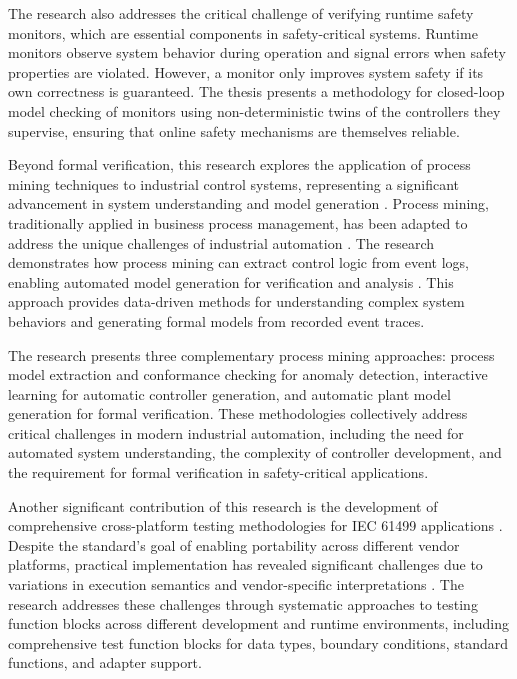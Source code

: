 The research also addresses the critical challenge of verifying runtime safety monitors, which are essential components in safety-critical systems. Runtime monitors observe system behavior during operation and signal errors when safety properties are violated. However, a monitor only improves system safety if its own correctness is guaranteed. The thesis presents a methodology for closed-loop model checking of monitors using non-deterministic twins of the controllers they supervise, ensuring that online safety mechanisms are themselves reliable.

Beyond formal verification, this research explores the application of process mining techniques to industrial control systems, representing a significant advancement in system understanding and model generation \cite{van2016process}. Process mining, traditionally applied in business process management, has been adapted to address the unique challenges of industrial automation \cite{van2012process1}. The research demonstrates how process mining can extract control logic from event logs, enabling automated model generation for verification and analysis \cite{van2004workflow}. This approach provides data-driven methods for understanding complex system behaviors and generating formal models from recorded event traces.

The research presents three complementary process mining approaches: process model extraction and conformance checking for anomaly detection, interactive learning for automatic controller generation, and automatic plant model generation for formal verification. These methodologies collectively address critical challenges in modern industrial automation, including the need for automated system understanding, the complexity of controller development, and the requirement for formal verification in safety-critical applications.

Another significant contribution of this research is the development of comprehensive cross-platform testing methodologies for IEC 61499 applications \cite{gerber2010does}. Despite the standard's goal of enabling portability across different vendor platforms, practical implementation has revealed significant challenges due to variations in execution semantics and vendor-specific interpretations \cite{pang2014portability}. The research addresses these challenges through systematic approaches to testing function blocks across different development and runtime environments, including comprehensive test function blocks for data types, boundary conditions, standard functions, and adapter support.

